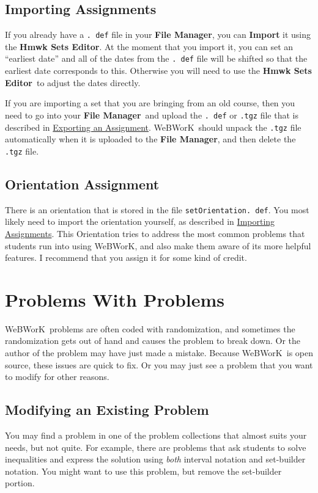\documentclass[12pt]{article}
\newcommand{\menu}[1]{\textbf{#1}}
\newcommand{\WW}{WeBWorK}
\newcommand{\HSE}{\menu{Hmwk Sets Editor}}
\newcommand{\FM}{\menu{File Manager}}
\begin{document}
\subsection{Importing Assignments}\label{imp}
If you already have  a \texttt{.
	def} file in your \FM, you can \menu{Import} it using the \HSE.
At the moment that you import it, you can set an ``earliest date'' and all of the dates from the \texttt{.
	def} file will be shifted so that the earliest date corresponds to this.
Otherwise you will need to use the \HSE\ to adjust the dates directly.

If you are importing a set that you are bringing from an old course, then you need to go into your \FM\ and upload the \texttt{.
	def} or \texttt{.tgz} file that is described in \hyperref[exp]{Exporting an Assignment}.  \WW\ should unpack the \texttt{.tgz} file automatically when it is uploaded to the \FM, and then delete the \texttt{.tgz} file.

\subsection{Orientation Assignment}\label{orientation}
There is an orientation that is stored in the file \texttt{setOrientation.
	def}.
You most likely need to import the orientation yourself, as described in \hyperref[imp]{Importing Assignments}.
This Orientation tries to address the most common problems that students run into using \WW, and also make them aware of its more helpful features.
I recommend that you assign it for some kind of credit.

\section{Problems With Problems}
\WW\ problems are often coded with randomization, and sometimes the randomization gets out of hand and causes the problem to break down.
Or the author of the problem may have just made a mistake.
Because \WW\ is open source, these issues are quick to fix.
Or you may just see a problem that you want to modify for other reasons.

\subsection{Modifying an Existing Problem}

You may find a problem in one of the problem collections that almost suits your needs, but not quite.
For example, there are problems that ask students to solve inequalities and express the solution using \emph{both} interval notation and set-builder notation.
You might want to use this problem, but remove the set-builder portion.
\end{document}
